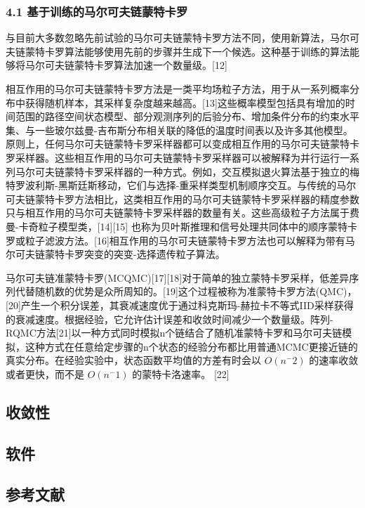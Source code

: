 \subsubsection{4.1 基于训练的马尔可夫链蒙特卡罗}

与目前大多数忽略先前试验的马尔可夫链蒙特卡罗方法不同，使用新算法，马尔可夫链蒙特卡罗算法能够使用先前的步骤并生成下一个候选。这种基于训练的算法能够将马尔可夫链蒙特卡罗算法加速一个数量级。[12]

相互作用的马尔可夫链蒙特卡罗方法是一类平均场粒子方法，用于从一系列概率分布中获得随机样本，其采样复杂度越来越高。[13]这些概率模型包括具有增加的时间范围的路径空间状态模型、部分观测序列的后验分布、增加条件分布的约束水平集、与一些玻尔兹曼-吉布斯分布相关联的降低的温度时间表以及许多其他模型。原则上，任何马尔可夫链蒙特卡罗采样器都可以变成相互作用的马尔可夫链蒙特卡罗采样器。这些相互作用的马尔可夫链蒙特卡罗采样器可以被解释为并行运行一系列马尔可夫链蒙特卡罗采样器的一种方式。例如，交互模拟退火算法基于独立的梅特罗波利斯-黑斯廷斯移动，它们与选择-重采样类型机制顺序交互。与传统的马尔可夫链蒙特卡罗方法相比，这类相互作用的马尔可夫链蒙特卡罗采样器的精度参数只与相互作用的马尔可夫链蒙特卡罗采样器的数量有关。这些高级粒子方法属于费曼-卡奇粒子模型类，[14][15] 也称为贝叶斯推理和信号处理共同体中的顺序蒙特卡罗或粒子滤波方法。[16]相互作用的马尔可夫链蒙特卡罗方法也可以解释为带有马尔可夫链蒙特卡罗突变的突变-选择遗传粒子算法。

马尔可夫链准蒙特卡罗(MCQMC)[17][18]对于简单的独立蒙特卡罗采样，低差异序列代替随机数的优势是众所周知的。[19]这个过程被称为准蒙特卡罗方法(QMC)，[20]产生一个积分误差，其衰减速度优于通过科克斯玛-赫拉卡不等式IID采样获得的衰减速度。根据经验，它允许估计误差和收敛时间减少一个数量级。阵列-RQMC方法[21]以一种方式同时模拟n个链结合了随机准蒙特卡罗和马尔可夫链模拟，这种方式在任意给定步骤的n个状态的经验分布都比用普通MCMC更接近链的真实分布。在经验实验中，状态函数平均值的方差有时会以 $O(n^-2)$ 的速率收敛或者更快，而不是 $O(n^-1)$  的蒙特卡洛速率。 [22]

\subsection{收敛性}



\subsection{软件}



\subsection{参考文献}
